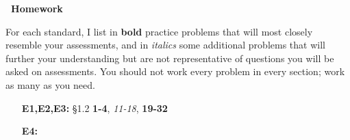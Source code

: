 \documentclass{article}
\begin{document}
\begin{center}
{\Large \bf \course\  Homework} \\
\sem
\end{center}

For each standard, I list in {\bf bold} practice problems that will most closely resemble your assessments, and in {\em italics} some additional problems that will further your understanding but are not representative of questions you will be asked on assessments.  You should not work every problem in every section; work as many as you need.

\begin{enumerate}
\item [{\bf E1,E2,E3:} ] \S 1.2 {\bf 1-4}, {\em 11-18}, {\bf 19-32}
\item [{\bf E4:} ]
\end{enumerate} 
\end{document}
